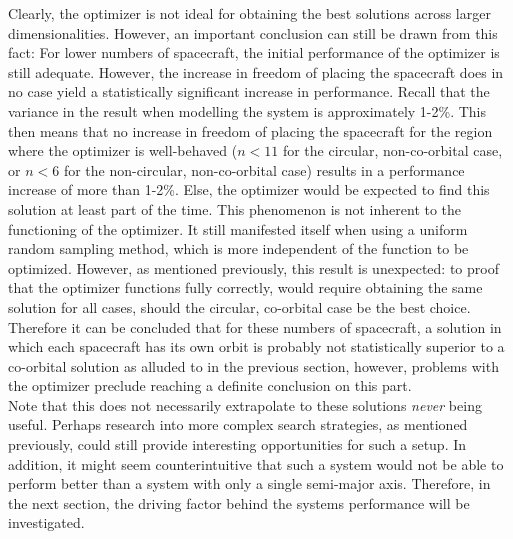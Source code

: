 Clearly, the optimizer is not ideal for obtaining the best solutions across larger dimensionalities. However, an important conclusion can still be drawn from this fact: For lower numbers of spacecraft, the initial performance of the optimizer is still adequate. However, the increase in freedom of placing the spacecraft does in no case yield a statistically significant increase in performance. Recall that the variance in the result when modelling the system is approximately 1-2\%. This then means that no increase in freedom of placing the spacecraft for the region where the optimizer is well-behaved ($n < 11$ for the circular, non-co-orbital case, or $n < 6$ for the non-circular, non-co-orbital case) results in a performance increase of more than 1-2\%. Else, the optimizer would be expected to find this solution at least part of the time. This phenomenon is not inherent to the functioning of the optimizer. It still manifested itself when using a uniform random sampling method, which is more independent of the function to be optimized. However, as mentioned previously, this result is unexpected: to proof that the optimizer functions fully correctly, would require obtaining the same solution for all cases, should the circular, co-orbital case be the best choice. Therefore it can be concluded that for these numbers of spacecraft, a solution in which each spacecraft has its own orbit is probably not statistically superior to a co-orbital solution as alluded to in the previous section, however, problems with the optimizer preclude reaching a definite conclusion on this part. \\

Note that this does not necessarily extrapolate to these solutions \textit{never} being useful. Perhaps research into more complex search strategies, as mentioned previously, could still provide interesting opportunities for such a setup. In addition, it might seem counterintuitive that such a system would not be able to perform better than a system with only a single semi-major axis. Therefore, in the next section, the driving factor behind the systems performance will be investigated.\\


